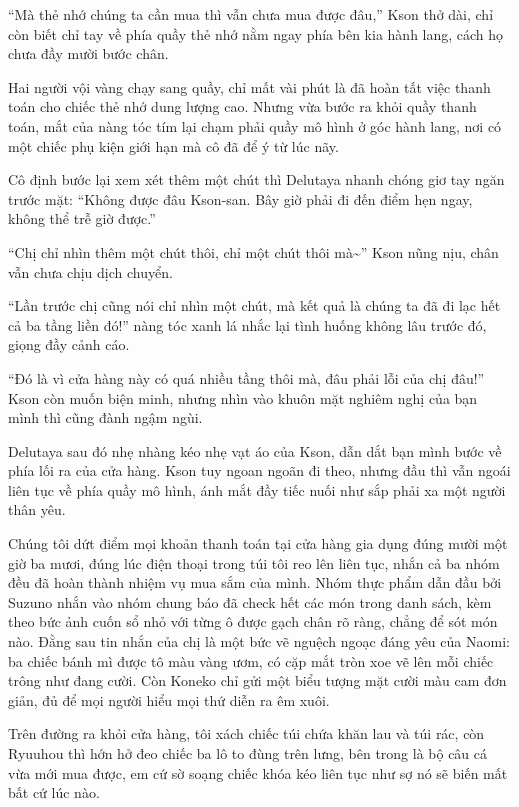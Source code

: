 ﻿\documentclass[../main.tex]{subfiles}
\begin{document}
``Mà thẻ nhớ chúng ta cần mua thì vẫn chưa mua được đâu,'' Kson thở dài, chỉ còn biết chỉ tay về phía quầy thẻ nhớ nằm ngay phía bên kia hành lang, cách họ chưa đầy mười bước chân.

Hai người vội vàng chạy sang quầy, chỉ mất vài phút là đã hoàn tất việc thanh toán cho chiếc thẻ nhớ dung lượng cao. Nhưng vừa bước ra khỏi quầy thanh toán, mắt của nàng tóc tím lại chạm phải quầy mô hình ở góc hành lang, nơi có một chiếc phụ kiện giới hạn mà cô đã để ý từ lúc nãy.

Cô định bước lại xem xét thêm một chút thì Delutaya nhanh chóng giơ tay ngăn trước mặt: ``Không được đâu Kson-san. Bây giờ phải đi đến điểm hẹn ngay, không thể trễ giờ được.''

``Chị chỉ nhìn thêm một chút thôi, chỉ một chút thôi mà\~{}'' Kson nũng nịu, chân vẫn chưa chịu dịch chuyển.

``Lần trước chị cũng nói chỉ nhìn một chút, mà kết quả là chúng ta đã đi lạc hết cả ba tầng liền đó!'' nàng tóc xanh lá nhắc lại tình huống không lâu trước đó, giọng đầy cảnh cáo.

``Đó là vì cửa hàng này có quá nhiều tầng thôi mà, đâu phải lỗi của chị đâu!'' Kson còn muốn biện minh, nhưng nhìn vào khuôn mặt nghiêm nghị của bạn mình thì cũng đành ngậm ngùi.

Delutaya sau đó nhẹ nhàng kéo nhẹ vạt áo của Kson, dẫn dắt bạn mình bước về phía lối ra của cửa hàng. Kson tuy ngoan ngoãn đi theo, nhưng đầu thì vẫn ngoái liên tục về phía quầy mô hình, ánh mắt đầy tiếc nuối như sắp phải xa một người thân yêu.

\ct

\pov{-}

Chúng tôi dứt điểm mọi khoản thanh toán tại cửa hàng gia dụng đúng mười một giờ ba mươi, đúng lúc điện thoại trong túi tôi reo lên liên tục, nhắn cả ba nhóm đều đã hoàn thành nhiệm vụ mua sắm của mình. Nhóm thực phẩm dẫn đầu bởi Suzuno nhắn vào nhóm chung báo đã check hết các món trong danh sách, kèm theo bức ảnh cuốn sổ nhỏ với từng ô được gạch chân rõ ràng, chẳng để sót món nào. Đằng sau tin nhắn của chị là một bức vẽ nguệch ngoạc đáng yêu của Naomi: ba chiếc bánh mì được tô màu vàng ươm, có cặp mắt tròn xoe vẽ lên mỗi chiếc trông như đang cười. Còn Koneko chỉ gửi một biểu tượng mặt cười màu cam đơn giản, đủ để mọi người hiểu mọi thứ diễn ra êm xuôi.

Trên đường ra khỏi cửa hàng, tôi xách chiếc túi chứa khăn lau và túi rác, còn Ryuuhou thì hớn hở đeo chiếc ba lô to đùng trên lưng, bên trong là bộ câu cá vừa mới mua được, em cứ sờ soạng chiếc khóa kéo liên tục như sợ nó sẽ biến mất bất cứ lúc nào.
\end{document}
